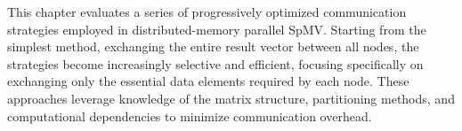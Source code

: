 \documentclass[a4paper,12pt]{book} %
\theoremstyle{definition}
\begin{document}
This chapter evaluates a series of progressively optimized communication strategies employed in distributed-memory parallel SpMV. Starting from the simplest method, exchanging the entire result vector between all nodes, the strategies become increasingly selective and efficient, focusing specifically on exchanging only the essential data elements required by each node. These approaches leverage knowledge of the matrix structure, partitioning methods, and computational dependencies to minimize communication overhead.
\medskip
\end{document}
